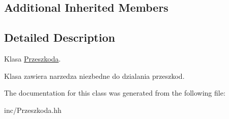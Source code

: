 \subsection*{Additional Inherited Members}


\subsection{Detailed Description}
Klasa \mbox{\hyperlink{class_przeszkoda}{Przeszkoda}}. 

Klasa zawiera narzedza niezbedne do dzialania przeszkod. 

The documentation for this class was generated from the following file\+:\begin{DoxyCompactItemize}
\item 
inc/Przeszkoda.\+hh\end{DoxyCompactItemize}
